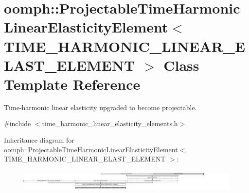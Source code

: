 \hypertarget{classoomph_1_1ProjectableTimeHarmonicLinearElasticityElement}{}\section{oomph\+:\+:Projectable\+Time\+Harmonic\+Linear\+Elasticity\+Element$<$ T\+I\+M\+E\+\_\+\+H\+A\+R\+M\+O\+N\+I\+C\+\_\+\+L\+I\+N\+E\+A\+R\+\_\+\+E\+L\+A\+S\+T\+\_\+\+E\+L\+E\+M\+E\+NT $>$ Class Template Reference}
\label{classoomph_1_1ProjectableTimeHarmonicLinearElasticityElement}


Time-\/harmonic linear elasticity upgraded to become projectable.  




{\ttfamily \#include $<$time\+\_\+harmonic\+\_\+linear\+\_\+elasticity\+\_\+elements.\+h$>$}

Inheritance diagram for oomph\+:\+:Projectable\+Time\+Harmonic\+Linear\+Elasticity\+Element$<$ T\+I\+M\+E\+\_\+\+H\+A\+R\+M\+O\+N\+I\+C\+\_\+\+L\+I\+N\+E\+A\+R\+\_\+\+E\+L\+A\+S\+T\+\_\+\+E\+L\+E\+M\+E\+NT $>$\+:\begin{figure}[H]
\begin{center}
\leavevmode
\includegraphics[height=1.116427cm]{classoomph_1_1ProjectableTimeHarmonicLinearElasticityElement}
\end{center}
\end{figure}
